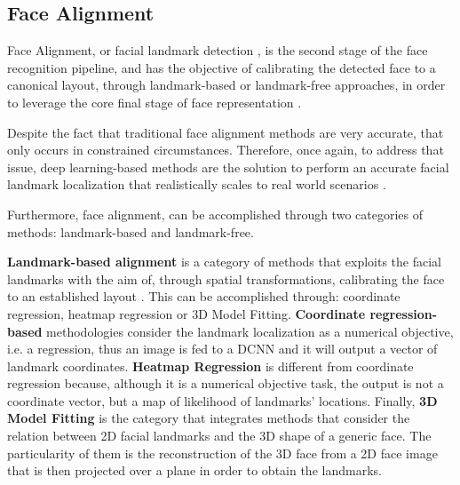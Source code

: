 \documentclass[class=report, crop=false, a4paper, 12pt]{standalone}
\begin{document}
\subsection{Face Alignment}
\par Face Alignment, or facial landmark detection \autocite{changFacePoseNetMakingCase2017}, is the second stage of the face recognition pipeline, and has the objective of calibrating the detected face to a canonical layout, through landmark-based or landmark-free approaches, in order to leverage the core final stage of face representation \autocite{duElementsEndtoendDeep2022}. 
\par Despite the fact that traditional face alignment methods are very accurate, that only occurs in constrained circumstances. Therefore, once again, to address that issue, deep learning-based methods are the solution to perform an accurate facial landmark localization that realistically scales to real world scenarios \autocite{fengWingLossRobust2018}. 
\par Furthermore, face alignment, can be accomplished through two categories of methods: landmark-based and landmark-free.

\vspace{\baselineskip}
\par \noindent \textbf{Landmark-based alignment} is a category of methods that exploits the facial landmarks with the aim of, through spatial transformations, calibrating the face to an established layout \autocite{duElementsEndtoendDeep2022}. This can be accomplished through: coordinate regression, heatmap regression or 3D Model Fitting. \textbf{Coordinate regression-based} methodologies \autocite{fengWingLossRobust2018,liuTwoStreamTransformerNetworks2018,zhangJointFaceDetection2016a} consider the landmark localization as a numerical objective, i.e. a regression, thus an image is fed to a DCNN and it will output a vector of landmark coordinates. \textbf{Heatmap Regression} \autocite{dengJointMultiviewFace2017,wuLookBoundaryBoundaryAware2018,chenFaceAlignmentKernel2019} is different from coordinate regression because, although it is a numerical objective task, the output is not a coordinate vector, but a map of likelihood of landmarks' locations. Finally, \textbf{3D Model Fitting} \autocite{bhagavatulaFasterRealtimeFacial2017,changFacePoseNetMakingCase2017,xiaoRecurrent3D2DDual2017}is the category that integrates methods that consider the relation between 2D facial landmarks and the 3D shape of a generic face. The particularity of them is the reconstruction of the 3D face from a 2D face image that is then projected over a plane in order to obtain the landmarks. 
\end{document}

